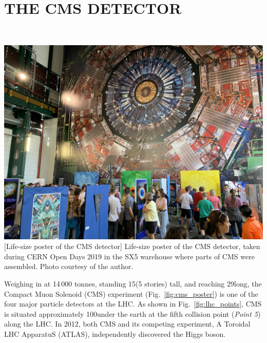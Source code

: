 \chapter{THE CMS DETECTOR} 
\label{ch:cms}
\textcolor{white}{words}  %
\begin{multiFigure}
    \centering
    \includegraphics[height=10cm]{figures/cms/cms_poster_SX5.jpg}
        [Life-size poster of the CMS detector]
        {Life-size poster of the CMS detector, taken during CERN Open Days 2019 in the SX5 warehouse where parts of CMS were assembled.
        Photo courtesy of the author.}
    \label{fig:cms_poster}
\end{multiFigure}
Weighing in at 14\,000 tonnes, standing 15\meter (5 stories) tall, and reaching 29\meter long, the Compact Muon Solenoid (CMS) experiment (Fig.~\ref{fig:cms_poster}) is one of 
the four major particle detectors at the LHC.
As shown in Fig.~\ref{fig:lhc_points}, CMS is situated approximately 100\meter under the earth at the fifth collision point (\emph{Point 5}) along the LHC.
In 2012, both CMS and its competing experiment, A Toroidal LHC ApparatuS (ATLAS), independently discovered the Higgs boson.
